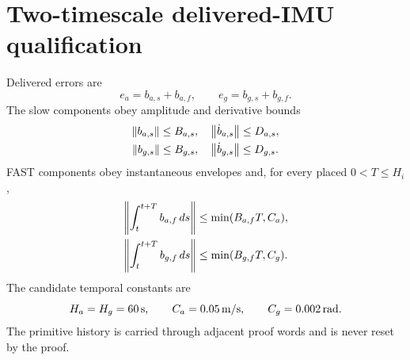 \documentclass[journal]{IEEEtran}
\begin{document}
\section{Two-timescale delivered-IMU qualification}
Delivered errors are
\[
e_a=b_{a,s}+b_{a,f},\qquad e_g=b_{g,s}+b_{g,f}.
\]
The slow components obey amplitude and derivative bounds
\[
\begin{gathered}
\left\lVert b_{a,s}\right\rVert\le B_{a,s},\quad\left\lVert\dot b_{a,s}\right\rVert\le D_{a,s},\\
\left\lVert b_{g,s}\right\rVert\le B_{g,s},\quad\left\lVert\dot b_{g,s}\right\rVert\le D_{g,s}.
\end{gathered}
\]
FAST components obey instantaneous envelopes and, for every placed
\(0<T\le H_i\),
\[
\begin{gathered}
\left\lVert\int_t^{t+T}b_{a,f}\,ds\right\rVert\le\min(B_{a,f}T,C_a),\\
\left\lVert\int_t^{t+T}b_{g,f}\,ds\right\rVert\le\min(B_{g,f}T,C_g).
\end{gathered}
\]
The candidate temporal constants are
\[
H_a=H_g=60\,{\rm s},\qquad C_a=0.05\,{\rm m/s},\qquad C_g=0.002\,{\rm rad}.
\]
The primitive history is carried through adjacent proof words and is never reset by the proof.
\end{document}
